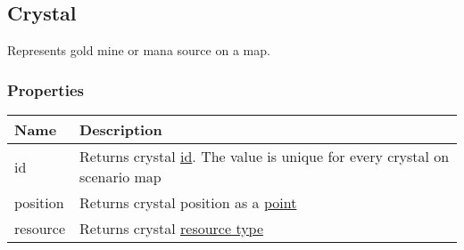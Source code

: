 \subsection{Crystal}
\label{Crystal}
Represents gold mine or mana source on a map.
\subsubsection{Properties}
\begin{center}
\begin{tabularx}{\linewidth}{| l | X |}
\hline
\textbf{Name} & \textbf{Description} \\
\hline
id & Returns crystal \hyperref[Id]{id}. The value is unique for every crystal on scenario map\\
\hline
position & Returns crystal position as a \hyperref[Point]{point}\\
\hline
resource & Returns crystal \hyperref[Resource]{resource type}\\
\hline
\end{tabularx}
\end{center}
